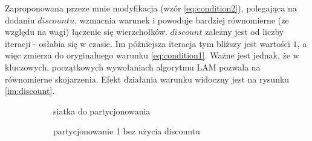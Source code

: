 Zaproponowana przeze mnie modyfikacja (wzór \ref{eq:condition2}), polegająca na dodaniu $discountu$,
wzmacnia warunek
i powoduje bardziej równomierne (ze względu na wagi) łączenie się wierzchołków.
$discount$ zależny jest od liczby iteracji - osłabia się w czasie.
Im późniejsza iteracja tym bliższy jest wartości $1$,
a więc zmierza do oryginalnego warunku \ref{eq:condition1}.
Ważne jest jednak, że w kluczowych, początkowych wywołaniach algorytmu LAM pozwala na równomierne skojarzenia.
Efekt działania warunku widoczny jest na rysunku \ref{im:discount}.
\vspace{8mm}
\begin{figure}[h]
\centering
\begin{subfigure}{.5\textwidth}
    \centering
    \caption[short]{siatka do partycjonowania}
\end{subfigure}%
\begin{subfigure}{.5\textwidth}
    \centering
    \caption[short]{partycjonowanie 1 bez użycia discountu}
\end{subfigure}
\begin{subfigure}{.5\textwidth}
    \centering

\end{subfigure}
\end{figure}
